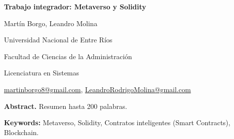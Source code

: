 \documentclass[a4paper,10pt]{article}
\begin{document}
	\pagestyle{empty}
	\begin{titlepage}
		\centering
		\vspace*{1.5cm}
		{\fontsize{14}{17}\bfseries Trabajo integrador: Metaverso y Solidity\par}
		{\small Martín Borgo, Leandro Molina\par}
		{\normalsize Universidad Nacional de Entre Ríos\par}
		{\normalsize Facultad de Ciencias de la Administración\par}
		{\normalsize Licenciatura en Sistemas \par}
		{\small \href{mailto:martinborgo8@gmail.com}{martinborgo8@gmail.com}, \href{mailto:LeandroRodrigoMolina@gmail.com}{LeandroRodrigoMolina@gmail.com}\par}
		
		{\small \textbf{Abstract.} Resumen hasta 200 palabras. \par}
		{\small \textbf{Keywords:} Metaverso, Solidity, Contratos inteligentes (Smart Contracts), Blockchain.\par}
	\end{titlepage}
	
\end{document}
